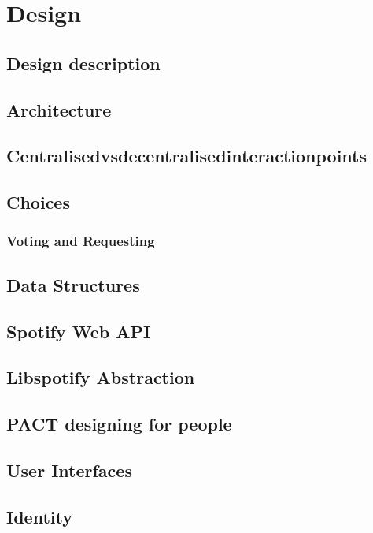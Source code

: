 \chapter{Design}


\section{Design description}


\section{Architecture}


\section{Centralisedvsdecentralisedinteractionpoints}


\section{Choices}



\subsection{Voting and Requesting}


\section{Data Structures}




\section{Spotify Web API}


\section{Libspotify Abstraction}


\section{PACT designing for people}


\section{User Interfaces}


\section{Identity}

